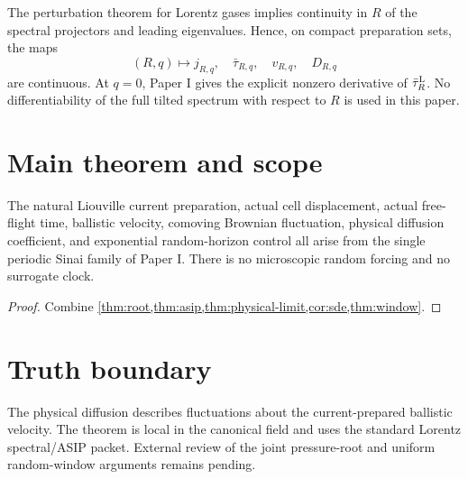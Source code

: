 The perturbation theorem for Lorentz gases implies continuity in $R$ of the
spectral projectors and leading eigenvalues.  Hence, on compact preparation
sets, the maps
\[
 (R,q)\mapsto j_{R,q},\quad \bar\tau_{R,q},\quad v_{R,q},\quad D_{R,q}
\]
are continuous.  At $q=0$, Paper I gives the explicit nonzero derivative of
$\bar\tau_R^{\rm L}$.  No differentiability of the full tilted spectrum with
respect to $R$ is used in this paper.

\section{Main theorem and scope}\label{sec:main}
\begin{theorem}\label{thm:main}
The natural Liouville current preparation, actual cell displacement, actual
free-flight time, ballistic velocity, comoving Brownian fluctuation, physical
diffusion coefficient, and exponential random-horizon control all arise from
the single periodic Sinai family of Paper I.  There is no microscopic random
forcing and no surrogate clock.
\end{theorem}
\begin{proof}
Combine \cref{thm:root,thm:asip,thm:physical-limit,cor:sde,thm:window}.
\end{proof}

\section*{Truth boundary}
The physical diffusion describes fluctuations about the current-prepared
ballistic velocity.  The theorem is local in the canonical field and uses the
standard Lorentz spectral/ASIP packet.  External review of the joint
pressure-root and uniform random-window arguments remains pending.
\printbibliography
